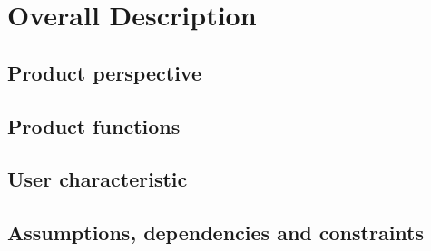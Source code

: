 \section{Overall Description}

\subsection{Product perspective}


\subsection{Product functions}


\subsection{User characteristic}


\subsection{Assumptions, dependencies and constraints}


